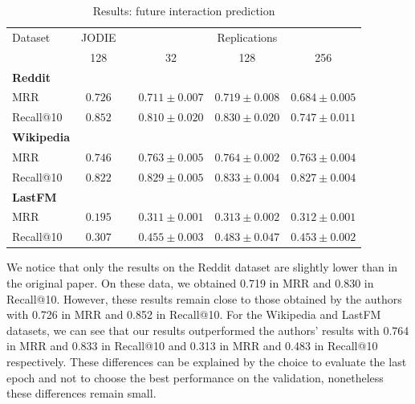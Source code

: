 \begin{table}[htbp]
    \centering
    \begin{tabular}{@{}lccccc@{}}
    \toprule
    Dataset\hspace*{3em} & JODIE & \phantom{abc} & \multicolumn{3}{c}{Replications} \\
    \cmidrule{2-2} \cmidrule{4-6}
    & 128 && \multicolumn{1}{c}{32} & \multicolumn{1}{c}{128} & \multicolumn{1}{c}{256} \\
    \midrule
    \multicolumn{1}{l}{\hspace{-0.2cm}\textbf{Reddit}} \\
    {\quad \small MRR} & $\boldsymbol{0.726}$  && $0.711 \pm 0.007$ & $0.719 \pm 0.008$ & $0.684 \pm 0.005$ \\
    {\quad\small Recall@10}  &$\boldsymbol{0.852}$ && $0.810 \pm 0.020$ & $0.830 \pm 0.020$ & $0.747 \pm 0.011$\\
    \multicolumn{1}{l}{\hspace{-0.2cm}\textbf{Wikipedia}}\\
    {\quad\small MRR} &$0.746$ && $\boldsymbol{0.763} \pm 0.005$ & $\boldsymbol{0.764} \pm 0.002$ & $\boldsymbol{0.763} \pm 0.004$  \\
    {\quad\small Recall@10}  & $0.822$ && $\boldsymbol{0.829} \pm 0.005$ & $\boldsymbol{0.833} \pm 0.004$ & $\boldsymbol{0.827} \pm 0.004$\\
    \multicolumn{1}{l}{\hspace{-0.2cm}\textbf{LastFM}} \\
    {\quad\small MRR} &$0.195$ && $\boldsymbol{0.311} \pm 0.001$ & $\boldsymbol{0.313} \pm 0.002$ & $\boldsymbol{0.312} \pm 0.001$ \\
    {\quad\small Recall@10}  & $0.307$ && $\boldsymbol{0.455} \pm 0.003$ & $\boldsymbol{0.483} \pm 0.047$ & $\boldsymbol{0.453} \pm 0.002$\\
    \bottomrule
    \end{tabular}
    \caption{Results: future interaction prediction}
    \label{result-interaction}
\end{table}

We notice that only the results on the Reddit dataset are slightly lower than in the original paper. On these data, we obtained 0.719 in MRR and 0.830 in Recall@10. However, these results remain close to those obtained by the authors with 0.726 in MRR and 0.852 in Recall@10. For the Wikipedia and LastFM datasets, we can see that our results outperformed the authors' results with 0.764 in MRR and 0.833 in Recall@10 and 0.313 in MRR and 0.483 in Recall@10 respectively. These differences can be explained by the choice to evaluate the last epoch and not to choose the best performance on the validation, nonetheless these differences remain small.\\

